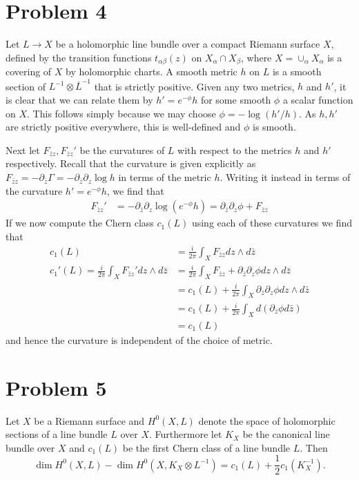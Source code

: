 \documentclass{../mathnotes}
\begin{document}
\section*{Problem 4}

Let $L\to X$ be a holomorphic line bundle over a compact Riemann surface $X$, defined by the transition functions $t_{\alpha\beta}(z)$ on $X_\alpha\cap X_\beta$,
where $X=\cup_{\alpha}X_\alpha$ is a covering of $X$ by holomorphic charts. A smooth metric $h$ on $L$ is a smooth section of $L^{-1}\otimes \overline{L}^{-1}$ that is strictly positive.
Given any two metrics, $h$ and $h'$, it is clear that we can relate them by $h'=e^{-\phi}h$ for some smooth $\phi$ a scalar function on $X$. This follows simply because we may choose
$\phi=-\log(h'/h)$. As $h,h'$ are strictly positive everywhere, this is well-defined and $\phi$ is smooth.

Next let $F_{\bar zz},F_{\bar zz}'$ be the curvatures of $L$ with respect to the metrics $h$ and $h'$ respectively. Recall that the curvature is given explicitly as
$F_{\bar zz}=-\partial_{\bar z}\Gamma=-\partial_{\bar z}\partial_{z}\log h$ in terms of the metric $h$. Writing it instead in terms of the curvature $h'=e^{-\phi}h$,
we find that
\begin{align*}
    F_{\bar zz}'&=-\partial_{\bar z}\partial_{z}\log\left( e^{-\phi}h \right)=\partial_{\bar z}\partial_z\phi+F_{\bar zz}
\end{align*}
If we now compute the Chern class $c_1(L)$ using each of these curvatures we find that
\begin{align*}
    c_1(L)&=\frac{i}{2\pi}\int_X F_{\bar zz}dz\wedge d\bar z\\
    c_1'(L)=\frac{i}{2\pi}\int_X F_{\bar zz}'dz\wedge d\bar z&=\frac{i}{2\pi}\int_XF_{\bar zz}+\partial_{\bar z}\partial_z\phi dz\wedge d\bar z\\
    &=c_1(L)+\frac{i}{2\pi}\int_X \partial_{\bar z}\partial_z\phi dz\wedge d\bar z\\
    &=c_1(L)+\frac{i}{2\pi}\int_X d\left( \partial_{\bar z}\phi d\bar z \right)\\
    &=c_1(L)
\end{align*}
and hence the curvature is independent of the choice of metric.

\section*{Problem 5}

\begin{thm}
    Let $X$ be a Riemann surface and $H^0(X,L)$ denote the space of holomorphic sections of a line bundle $L$ over $X$. Furthermore let $K_X$ be the canonical line bundle over $X$ and
    $c_1(L)$ be the first Chern class of a line bundle $L$. Then
    \[\dim H^0(X,L)-\dim H^0(X,K_X\otimes L^{-1})=c_1(L)+\frac{1}{2}c_1(K_X^{-1}).\]
\end{thm}
\end{document}
